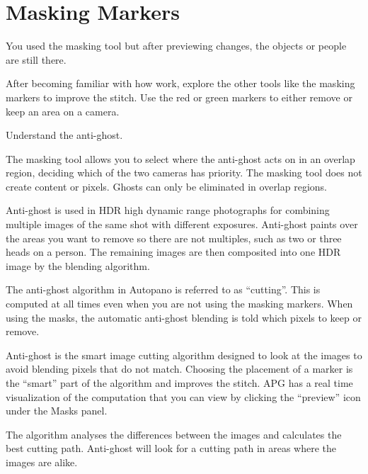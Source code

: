 \section{Masking Markers}
\pagecolor{white}
\label{chap:41}
\begin{fullwidth}

\problem

{\large You used the masking tool but after previewing changes, the objects or people are still there. \par}

After becoming familiar with how \textbf{} work, explore the other tools like the masking markers to improve the stitch. Use the red or green markers to either remove or keep an area on a camera. 


\solutions

{\large Understand the anti-ghost. \par}

The masking tool allows you to select where the anti-ghost acts on in an overlap region, deciding which of the two cameras has priority. The masking tool does not create content or pixels. Ghosts can only be eliminated in overlap regions.


Anti-ghost is used in HDR high dynamic range photographs for combining multiple images of the same shot with different exposures. Anti-ghost paints over the areas you want to remove so there are not multiples, such as two or three heads on a person. The remaining images are then composited into one HDR image by the blending algorithm.

The anti-ghost algorithm in Autopano is referred to as “cutting”. This is computed at all times even when you are not using the masking markers. When using the masks, the automatic anti-ghost blending is told which pixels to keep or remove. 

Anti-ghost is the smart image cutting algorithm designed to look at the images to avoid blending pixels that do not match. Choosing the placement of a marker is the “smart” part of the algorithm and improves the stitch. APG has a real time visualization of the computation that you can view by clicking the “preview” icon under the Masks panel.

The algorithm analyses the differences between the images and calculates the best cutting path. Anti-ghost will look for a cutting path in areas where the images are alike. 


\end{fullwidth}
